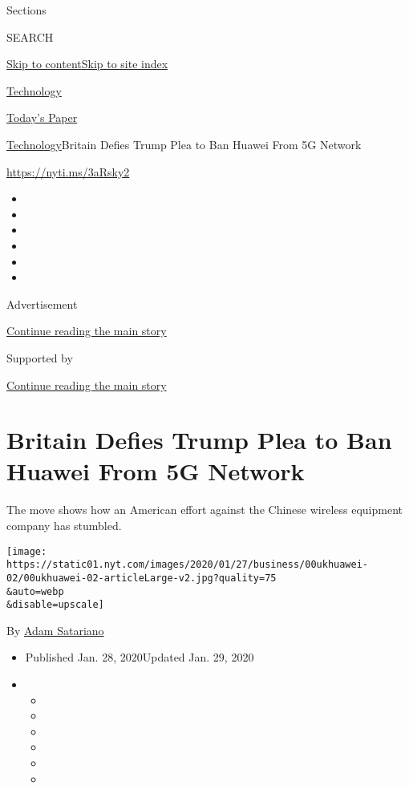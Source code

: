 Sections

SEARCH

\protect\hyperlink{site-content}{Skip to
content}\protect\hyperlink{site-index}{Skip to site index}

\href{https://www.nytimes.com/section/technology}{Technology}

\href{https://myaccount.nytimes.com/auth/login?response_type=cookie\&client_id=vi}{}

\href{https://www.nytimes.com/section/todayspaper}{Today's Paper}

\href{/section/technology}{Technology}\textbar{}Britain Defies Trump
Plea to Ban Huawei From 5G Network

\url{https://nyti.ms/3aRsky2}

\begin{itemize}
\item
\item
\item
\item
\item
\item
\end{itemize}

Advertisement

\protect\hyperlink{after-top}{Continue reading the main story}

Supported by

\protect\hyperlink{after-sponsor}{Continue reading the main story}

\hypertarget{britain-defies-trump-plea-to-ban-huawei-from-5g-network}{%
\section{Britain Defies Trump Plea to Ban Huawei From 5G
Network}\label{britain-defies-trump-plea-to-ban-huawei-from-5g-network}}

The move shows how an American effort against the Chinese wireless
equipment company has stumbled.

\texttt{[image: https://static01.nyt.com/images/2020/01/27/business/00ukhuawei-02/00ukhuawei-02-articleLarge-v2.jpg?quality=75\\\&auto=webp\\\&disable=upscale]}

By \href{https://www.nytimes.com/by/adam-satariano}{Adam Satariano}

\begin{itemize}
\item
  Published Jan. 28, 2020Updated Jan. 29, 2020
\item
  \begin{itemize}
  \item
  \item
  \item
  \item
  \item
  \item
  \end{itemize}
\end{itemize}

